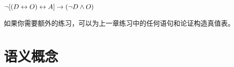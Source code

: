 \begin{compactlist}
%


\item	$\neg [(D \leftrightarrow O) \leftrightarrow A] \rightarrow (\neg D \wedge O) $

\end{compactlist}

如果你需要额外的练习，可以为上一章练习中的任何语句和论证构造真值表。

\chapter{语义概念}
\label{s:SemanticConcepts}


